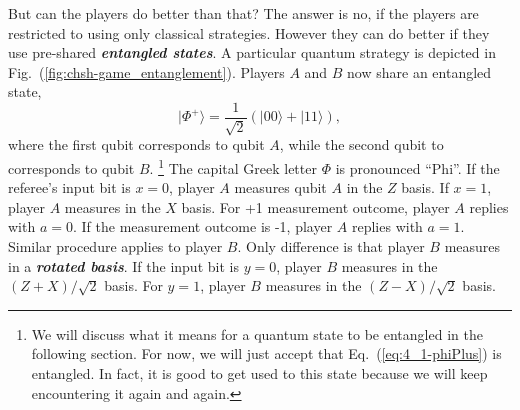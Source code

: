 But can the players do better than that?
The answer is no, if the players are restricted to using only classical strategies.
However they can do better if they use pre-shared \textbf{\emph{entangled states}}.
A particular quantum strategy is depicted in Fig.~(\ref{fig:chsh-game_entanglement}).
Players $A$ and $B$ now share an entangled state,
\begin{equation}
    |\Phi^+\rangle = \frac{1}{\sqrt{2}} (|00\rangle + |11\rangle),
    \label{eq:4_1-phiPlus}
\end{equation}
where the first qubit corresponds to qubit $A$, while the second qubit to corresponds to qubit $B$.
\footnote{We will discuss what it means for a quantum state to be entangled in the following section.
For now, we will just accept that Eq.~(\ref{eq:4_1-phiPlus}) is entangled.
In fact, it is good to get used to this state because we will keep encountering it again and again.}
The capital Greek letter $\Phi$ is pronounced ``Phi''.
If the referee's input bit is $x=0$, player $A$ measures qubit $A$ in the $Z$ basis.
If $x=1$, player $A$ measures in the $X$ basis.
For +1 measurement outcome, player $A$ replies with $a=0$.
If the measurement outcome is -1, player $A$ replies with $a=1$.
Similar procedure applies to player $B$.
Only difference is that player $B$ measures in a \textbf{\emph{rotated basis}}.
If the input bit is $y=0$, player $B$ measures in the $(Z+X)/\sqrt{2}$ basis.
For $y=1$, player $B$ measures in the $(Z-X)/\sqrt{2}$ basis.

